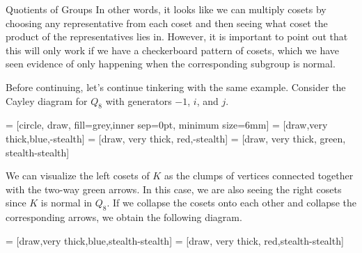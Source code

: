 \begin{section}{Quotients of Groups}
In other words, it looks like we can multiply cosets by choosing any representative from each coset and then seeing what coset the product of the representatives lies in.  However, it is important to point out that this will only work if we have a checkerboard pattern of cosets, which we have seen evidence of only happening when the corresponding subgroup is normal.

Before continuing, let's continue tinkering with the same example.  Consider the Cayley diagram for $Q_8$ with generators $-1$, $i$, and $j$.

 = [circle, draw, fill=grey,inner sep=0pt, minimum size=6mm]
 = [draw,very thick,blue,-stealth]
 = [draw, very thick, red,-stealth]
 = [draw, very thick, green, stealth-stealth]

\begin{center}
\end{center}
We can visualize the left cosets of $K$ as the clumps of vertices connected together with the two-way green arrows.  In this case, we are also seeing the right cosets since $K$ is normal in $Q_8$.  If we collapse the cosets onto each other and collapse the corresponding arrows, we obtain the following diagram.

 = [draw,very thick,blue,stealth-stealth]
 = [draw, very thick, red,stealth-stealth]


\end{section}
